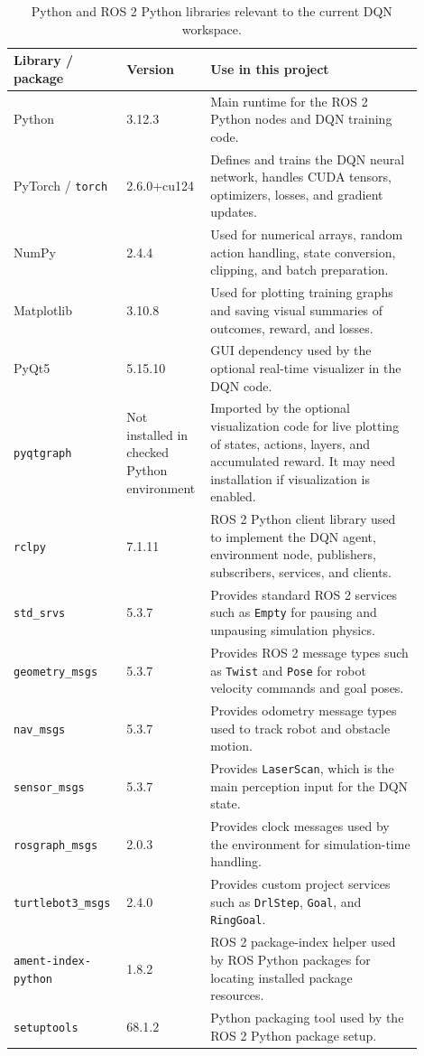 \documentclass[11pt,a4paper]{article}
\begin{document}
\begin{table}[h]
\centering
\begin{tabular}{p{0.23\linewidth} p{0.17\linewidth} p{0.50\linewidth}}
\toprule
\textbf{Library / package} & \textbf{Version} & \textbf{Use in this project} \\
\midrule
Python & 3.12.3 & Main runtime for the ROS 2 Python nodes and DQN training code. \\
PyTorch / \texttt{torch} & 2.6.0+cu124 & Defines and trains the DQN neural network, handles CUDA tensors, optimizers, losses, and gradient updates. \\
NumPy & 2.4.4 & Used for numerical arrays, random action handling, state conversion, clipping, and batch preparation. \\
Matplotlib & 3.10.8 & Used for plotting training graphs and saving visual summaries of outcomes, reward, and losses. \\
PyQt5 & 5.15.10 & GUI dependency used by the optional real-time visualizer in the DQN code. \\
\texttt{pyqtgraph} & Not installed in checked Python environment & Imported by the optional visualization code for live plotting of states, actions, layers, and accumulated reward. It may need installation if visualization is enabled. \\
\texttt{rclpy} & 7.1.11 & ROS 2 Python client library used to implement the DQN agent, environment node, publishers, subscribers, services, and clients. \\
\texttt{std\_srvs} & 5.3.7 & Provides standard ROS 2 services such as \texttt{Empty} for pausing and unpausing simulation physics. \\
\texttt{geometry\_msgs} & 5.3.7 & Provides ROS 2 message types such as \texttt{Twist} and \texttt{Pose} for robot velocity commands and goal poses. \\
\texttt{nav\_msgs} & 5.3.7 & Provides odometry message types used to track robot and obstacle motion. \\
\texttt{sensor\_msgs} & 5.3.7 & Provides \texttt{LaserScan}, which is the main perception input for the DQN state. \\
\texttt{rosgraph\_msgs} & 2.0.3 & Provides clock messages used by the environment for simulation-time handling. \\
\texttt{turtlebot3\_msgs} & 2.4.0 & Provides custom project services such as \texttt{DrlStep}, \texttt{Goal}, and \texttt{RingGoal}. \\
\texttt{ament-index-python} & 1.8.2 & ROS 2 package-index helper used by ROS Python packages for locating installed package resources. \\
\texttt{setuptools} & 68.1.2 & Python packaging tool used by the ROS 2 Python package setup. \\
\bottomrule
\end{tabular}
\caption{Python and ROS 2 Python libraries relevant to the current DQN workspace.}
\end{table}
\end{document}
